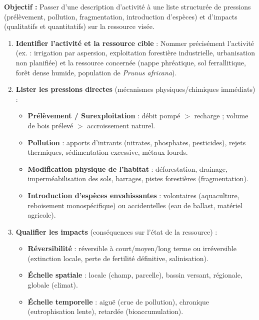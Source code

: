 \documentclass[11pt]{article}
\begin{document}
\begin{methode}
    \textbf{Objectif :} Passer d'une description d'activité à une liste structurée de pressions (prélèvement, pollution, fragmentation, introduction d'espèces) et d'impacts (qualitatifs et quantitatifs) sur la ressource visée.
    \begin{enumerate}
        \item \textbf{Identifier l'activité et la ressource cible} : Nommer précisément l'activité (ex. : irrigation par aspersion, exploitation forestière industrielle, urbanisation non planifiée) et la ressource concernée (nappe phréatique, sol ferrallitique, forêt dense humide, population de \emph{Prunus africana}).
        \item \textbf{Lister les pressions directes} (mécanismes physiques/chimiques immédiats) :
        \begin{itemize}
            \item \textbf{Prélèvement / Surexploitation} : débit pompé $>$ recharge ; volume de bois prélevé $>$ accroissement naturel.
            \item \textbf{Pollution} : apports d'intrants (nitrates, phosphates, pesticides), rejets thermiques, sédimentation excessive, métaux lourds.
            \item \textbf{Modification physique de l'habitat} : déforestation, drainage, imperméabilisation des sols, barrages, pistes forestières (fragmentation).
            \item \textbf{Introduction d'espèces envahissantes} : volontaires (aquaculture, reboisement monospécifique) ou accidentelles (eau de ballast, matériel agricole).
        \end{itemize}
        \item \textbf{Qualifier les impacts} (conséquences sur l'état de la ressource) :
        \begin{itemize}
            \item \textbf{Réversibilité} : réversible à court/moyen/long terme ou irréversible (extinction locale, perte de fertilité définitive, salinisation).
            \item \textbf{Échelle spatiale} : locale (champ, parcelle), bassin versant, régionale, globale (climat).
            \item \textbf{Échelle temporelle} : aiguë (crue de pollution), chronique (eutrophisation lente), retardée (bioaccumulation).
        \end{itemize}

\end{enumerate}
\end{methode}
\end{document}
